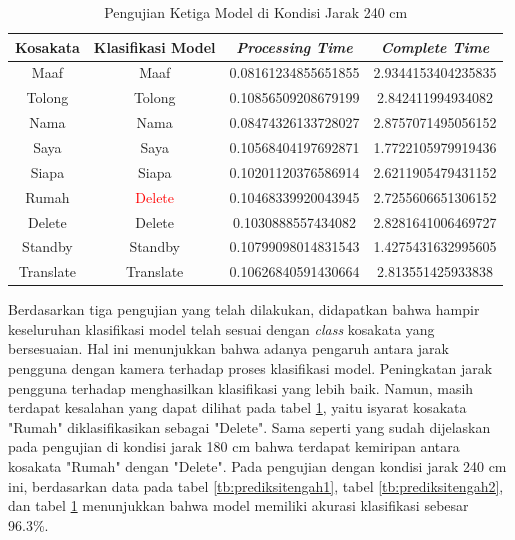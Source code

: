 \begin{longtable}{|c|c|c|c|}
  \caption{Pengujian Ketiga Model di Kondisi Jarak 240 cm}
  \label{tb:prediksitengah3}                                   \\
  \hline
  \rowcolor[HTML]{C0C0C0}
  \textbf{Kosakata} & \textbf{Klasifikasi Model} & \textbf{\emph{Processing Time}} & \textbf{\emph{Complete Time}}\\
  \hline
  Maaf              & Maaf                        & 0.08161234855651855                           & 2.9344153404235835                                  \\
  Tolong            & Tolong                        & 0.10856509208679199                           & 2.842411994934082                                  \\
  Nama              & Nama                        & 0.08474326133728027                           & 2.8757071495056152                                  \\
  Saya              & Saya                        & 0.10568404197692871                           & 1.7722105979919436                                  \\
  Siapa              & Siapa                        & 0.10201120376586914                           & 2.6211905479431152                                  \\
  Rumah             & \textcolor{red}{Delete}                        & 0.10468339920043945                           & 2.7255606651306152                                  \\
  Delete            & Delete                        & 0.1030888557434082                           & 2.8281641006469727                                  \\
  Standby           & Standby                        & 0.10799098014831543                           & 1.4275431632995605                                  \\
  Translate         & Translate                        & 0.10626840591430664                           & 2.813551425933838                                  \\
  \hline
\end{longtable}

Berdasarkan tiga pengujian yang telah dilakukan, didapatkan bahwa hampir keseluruhan klasifikasi model telah sesuai dengan \emph{class} kosakata yang bersesuaian. Hal ini menunjukkan bahwa adanya pengaruh antara jarak pengguna dengan kamera terhadap proses klasifikasi model. Peningkatan jarak pengguna terhadap menghasilkan klasifikasi yang lebih baik. Namun, masih terdapat kesalahan yang dapat dilihat pada tabel \ref{tb:prediksitengah3}, yaitu isyarat kosakata "Rumah" diklasifikasikan sebagai "Delete". Sama seperti yang sudah dijelaskan pada pengujian di kondisi jarak 180 cm bahwa terdapat kemiripan antara kosakata "Rumah" dengan "Delete". Pada pengujian dengan kondisi jarak 240 cm ini, berdasarkan data pada tabel \ref{tb:prediksitengah1}, tabel \ref{tb:prediksitengah2}, dan tabel \ref{tb:prediksitengah3} menunjukkan bahwa model memiliki akurasi klasifikasi sebesar 96.3\%.


